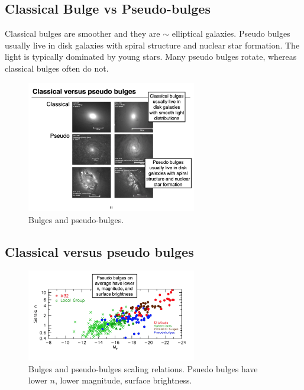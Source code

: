\documentclass{article}
\begin{document}
\subsection{Classical Bulge vs Pseudo-bulges}

Classical bulges are smoother and they are $\sim$ elliptical galaxies. Pseudo bulges usually live in disk galaxies with spiral structure and nuclear star formation. The light is typically dominated by young stars. Many pseudo bulges rotate, whereas classical bulges often do not.  

\begin{figure}
    \centering
    \includegraphics[width=0.66\textwidth]{figs/Screen Shot 2021-10-22 at 10.02.22 AM.png}
    \caption{Bulges and pseudo-bulges.}
    \label{fig:bulges}
\end{figure}

\subsection{Classical versus pseudo bulges}

\begin{figure}
    \centering
    \includegraphics[width=0.66\textwidth]{figs/Screen Shot 2021-10-22 at 10.04.29 AM.png}
    \caption{Bulges and pseudo-bulges scaling relations. Psuedo bulges have lower $n$, lower magnitude, surface brightness. }
    \label{fig:bulges_relations}
\end{figure}
\end{document}
